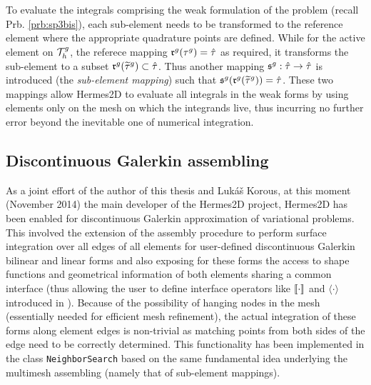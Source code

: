To evaluate the integrals comprising the weak formulation of the problem (recall Prb. \ref{prb:sp3bis}), each
sub-element needs to be transformed to the reference element where the appropriate quadrature points are defined.
While for the active element on $\mathcal{T}_{h}^g$, the referece mapping $\mathfrak{r}^g(\tau^g) = \hat{\tau}$ as required, it
transforms the sub-element to a subset $\mathfrak{r}^g(\widetilde{\tau}^g) \subset \hat{\tau}$. Thus another mapping
$\mathfrak{s}^g : \hat{\tau} \to \hat{\tau}$ is introduced (the \textit{sub-element mapping}) such that
$\mathfrak{s}^g(\mathfrak{r}^g(\widetilde{\tau}^g)) = \hat{\tau}$. These two mappings allow Hermes2D to evaluate all
integrals in the weak forms by using elements only on the mesh on which the integrands live, thus incurring no further
error beyond the inevitable one of numerical integration.

\subsection{Discontinuous Galerkin assembling}\label{sec:hermes_dg}
As a joint effort of the author of this thesis and Luk{\' a}{\v s} Korous, at this moment (November 2014) the main
developer of the Hermes2D project, Hermes2D has been enabled for discontinuous Galerkin approximation of
variational problems. This involved the extension of the assembly procedure to
perform surface integration over all edges of all elements for user-defined discontinuous Galerkin bilinear and linear
forms and also exposing for these forms the access to shape functions and geometrical information of both elements sharing a
common interface (thus allowing the user to define interface operators like $\llbracket\cdot\rrbracket$ and $\langle\cdot\rangle$ introduced in
 ). 
 Because of the possibility of hanging nodes in the mesh (essentially needed for efficient mesh
 refinement), the actual integration of these forms along element edges is non-trivial as matching points
 from both sides of the edge need to be correctly determined.  
This functionality has been implemented in the class \lstinline{NeighborSearch} based on the same fundamental idea
underlying the multimesh assembling (namely that of sub-element mappings).

